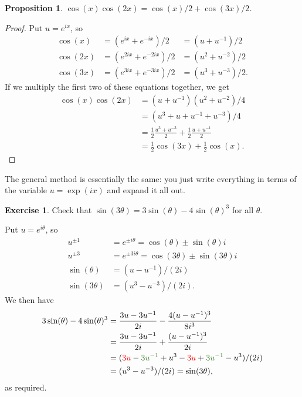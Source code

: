 \documentclass[a4paper]{book}
\newcommand{\RED}[1]{{\color{red}#1}}
\newcommand{\OLIVEGREEN}[1]{{\color{olivegreen}#1}}
\newcommand{\tht}       {\theta}
\renewcommand{\:}{\colon}
\newtheorem{proposition}[theorem]{Proposition}
\theoremstyle{definition}
\newtheorem{exercise}[theorem]{Exercise}
\renewenvironment{solution}{\SolutionInline}{\endSolutionInline}
\begin{document}
\begin{proposition}
 $\cos(x)\cos(2x)=\cos(x)/2+\cos(3x)/2$.
\end{proposition}
\begin{proof}
 Put $u=e^{ix}$, so
 \[ \begin{array}{rll}
  \cos(x)  &= (e^{ix}+e^{-ix})/2   &= (u+u^{-1})/2 \\
  \cos(2x) &= (e^{2ix}+e^{-2ix})/2 &= (u^2+u^{-2})/2 \\
  \cos(3x) &= (e^{3ix}+e^{-3ix})/2 &= (u^3+u^{-3})/2.
 \end{array} \]
 If we multiply the first two of these equations together, we get
 \begin{align*}
  \cos(x)\cos(2x) &= (u+u^{-1})(u^2+u^{-2})/4 \\
                  &= (u^3+u+u^{-1}+u^{-3})/4 \\
                  &= \frac{1}{2} \frac{u^3+u^{-3}}{2} +
                     \frac{1}{2} \frac{u+u^{-1}}{2} \\
                  &= \frac{1}{2}\cos(3x) + \frac{1}{2}\cos(x).
 \end{align*}
\end{proof}
The general method is essentially the same: you just write everything
in terms of the variable $u=\exp(ix)$ and expand it all out.
\begin{exercise}
 Check that $\sin(3\tht)=3\sin(\tht)-4\sin(\tht)^3$ for all $\tht$.
\end{exercise}
\begin{solution}
 Put $u=e^{i\tht}$, so
 \begin{align*}
  u^{\pm 1} &= e^{\pm i\tht} = \cos(\tht) \pm \sin(\tht)i \\
  u^{\pm 3} &= e^{\pm 3i\tht} = \cos(3\tht) \pm \sin(3\tht)i \\
  \sin(\tht) &= (u-u^{-1})/(2i) \\
  \sin(3\tht) &= (u^3-u^{-3})/(2i).
 \end{align*}
 We then have
 \begin{align*}
  3\sin(\tht)-4\sin(\tht)^3 &= 
   \frac{3u-3u^{-1}}{2i} - \frac{4(u-u^{-1})^3}{8i^3} \\
  &= \frac{3u-3u^{-1}}{2i} + \frac{(u-u^{-1})^3}{2i} \\
  &= (\RED{3u}-\OLIVEGREEN{3u^{-1}}+u^3-
      \RED{3u}+\OLIVEGREEN{3u^{-1}}-u^3)/(2i) \\ 
  &= (u^3-u^{-3})/(2i) = \sin(3\tht),
 \end{align*}
 as required.
\end{solution}
\end{document}
